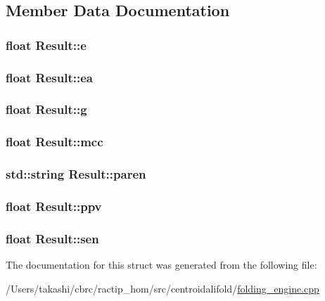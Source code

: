 \subsection{Member Data Documentation}
\hypertarget{struct_result_af5c4fcf9c970bc4fa6aa012983f4f7a8}{
\subsubsection[{e}]{\setlength{\rightskip}{0pt plus 5cm}float Result\+::e}}\label{struct_result_af5c4fcf9c970bc4fa6aa012983f4f7a8}
\hypertarget{struct_result_a852fe7c67bf3479031184db1aa0d77e9}{
\subsubsection[{ea}]{\setlength{\rightskip}{0pt plus 5cm}float Result\+::ea}}\label{struct_result_a852fe7c67bf3479031184db1aa0d77e9}
\hypertarget{struct_result_abc9ebc61c9bf5c894e28a41bbded49df}{
\subsubsection[{g}]{\setlength{\rightskip}{0pt plus 5cm}float Result\+::g}}\label{struct_result_abc9ebc61c9bf5c894e28a41bbded49df}
\hypertarget{struct_result_ab1732680ae2f2470872d1271303928a7}{
\subsubsection[{mcc}]{\setlength{\rightskip}{0pt plus 5cm}float Result\+::mcc}}\label{struct_result_ab1732680ae2f2470872d1271303928a7}
\hypertarget{struct_result_aac6267b349ffcbfc9407fb349f3e8ee2}{
\subsubsection[{paren}]{\setlength{\rightskip}{0pt plus 5cm}std\+::string Result\+::paren}}\label{struct_result_aac6267b349ffcbfc9407fb349f3e8ee2}
\hypertarget{struct_result_a7e3e0b23b5aa1d1238ecc84bb22c4730}{
\subsubsection[{ppv}]{\setlength{\rightskip}{0pt plus 5cm}float Result\+::ppv}}\label{struct_result_a7e3e0b23b5aa1d1238ecc84bb22c4730}
\hypertarget{struct_result_a4e5d7f0713c789685bc004d2ba2ce13a}{
\subsubsection[{sen}]{\setlength{\rightskip}{0pt plus 5cm}float Result\+::sen}}\label{struct_result_a4e5d7f0713c789685bc004d2ba2ce13a}


The documentation for this struct was generated from the following file\+:\begin{DoxyCompactItemize}
\item 
/\+Users/takashi/cbrc/ractip\+\_\+hom/src/centroidalifold/\hyperlink{folding__engine_8cpp}{folding\+\_\+engine.\+cpp}\end{DoxyCompactItemize}
